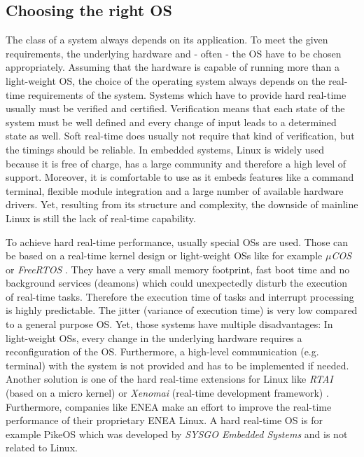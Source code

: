 \subsection{Choosing the right OS}
The class of a system always depends on its application. To meet the given requirements,
the underlying hardware and - often - the OS have to be chosen appropriately. 
Assuming that the hardware is capable of running more than a light-weight OS, the choice of the operating
system always depends on the real-time requirements of the system. 
Systems which have to provide hard real-time usually must be verified and certified. 
Verification means that each state of the system must be well defined and every change of input leads to a
determined state as well.
Soft real-time does usually not require that kind of verification, but the timings should be reliable. 
In embedded systems, Linux is widely used because it is free of charge, has a large community and therefore a high level of support. 
Moreover, it is comfortable to use as it embeds features like a command terminal, flexible module integration and a large number of available hardware drivers.
Yet, resulting from its structure and complexity, the downside of mainline Linux is still the lack of real-time capability.
\par
To achieve hard real-time performance, usually special \acp{OS} are used. 
Those can be based on a real-time kernel design or light-weight \acp{OS} like for example \textit{$\mu$COS} \cite{micrium:microcos} or \textit{FreeRTOS} \cite{freertos}.
They have a very small memory footprint, fast boot time and no background services (deamons) which could unexpectedly disturb the execution of real-time tasks. 
Therefore the execution time of tasks and interrupt processing is highly predictable.
The jitter (variance of execution time) is very low compared to a general purpose \ac{OS}.
Yet, those systems have multiple disadvantages:
In light-weight \acp{OS}, every change in the underlying hardware requires a reconfiguration of the OS.
Furthermore, a high-level communication (e.g. terminal) with the system is not provided and has to be implemented if needed. 
Another solution is one of the hard real-time extensions for Linux like \textit{\ac{RTAI}} (based on a micro kernel) \cite{rtai} or \textit{Xenomai} (real-time development framework) \cite{xenomai}.
Furthermore, companies like ENEA \cite{stromblad:elfrtoemd} make an effort to improve the real-time performance of their proprietary ENEA Linux.  
A hard real-time \ac{OS} is for example PikeOS \cite{sysgo:prt} which was developed by \textit{SYSGO Embedded Systems} and is not related to Linux.

